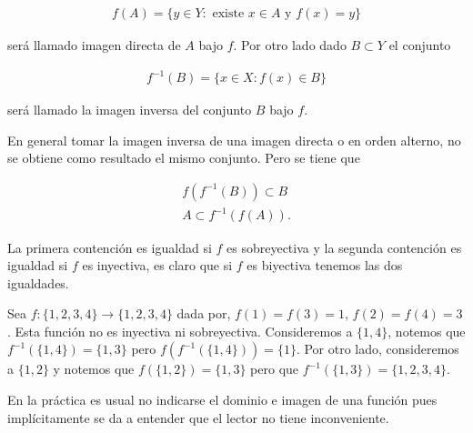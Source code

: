  \begin{align*}
 f(A)=\{y \in Y : \text{ existe }x \in A \text{ y } f(x)=y\}
 \end{align*}

será llamado imagen directa de $A$ bajo $f$. Por otro lado  dado $B \subset Y$ el conjunto 

\begin{align*}
f^{-1}(B)=\{x \in X :  f(x) \in B \}
\end{align*}

será llamado la imagen inversa del conjunto $B$ bajo $f$. 

\begin{ob}
En general tomar la imagen inversa de una imagen directa o en orden alterno, no se obtiene como resultado el mismo conjunto. Pero se tiene que

	
	\begin{align*}
	f(f^{-1}(B)) \subset B \\
	A \subset f^{-1}(f(A)) .
	\end{align*}

La primera contención es igualdad si $f$ es sobreyectiva y la segunda contención es igualdad si $f$ es inyectiva, es claro que si $f$ es biyectiva tenemos las dos igualdades. 
\end{ob}

\begin{ej}
Sea $f:\{1,2,3,4\} \to \{1,2,3,4\}$ dada por, $f(1)=f(3)=1$, $f(2)=f(4)=3$. Esta función no es inyectiva ni sobreyectiva. Consideremos a $\{1,4\}$, notemos que $f^{-1}(\{1,4\})=\{1,3\}$ pero $f(f^{-1}(\{1,4\}))=\{1\}$. Por otro lado, consideremos a $\{1,2\}$ y notemos que $f(\{1,2\})=\{1,3\}$  pero que $f^{-1}(\{1,3\})=\{1,2,3,4\}$.
\end{ej}

En la práctica es usual no indicarse el dominio e imagen de una función pues implícitamente se da a entender que el lector no tiene inconveniente.

